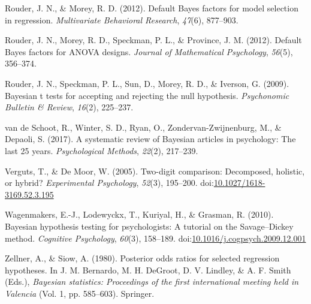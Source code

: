 \documentclass[english,,doc,floatsintext]{apa6}
\begin{document}
\leavevmode\hypertarget{ref-rouder2012defaultRegression}{}%
Rouder, J. N., \& Morey, R. D. (2012). Default Bayes factors for model selection in regression. \emph{Multivariate Behavioral Research}, \emph{47}(6), 877--903.

\leavevmode\hypertarget{ref-rouder2012defaultAnova}{}%
Rouder, J. N., Morey, R. D., Speckman, P. L., \& Province, J. M. (2012). Default Bayes factors for ANOVA designs. \emph{Journal of Mathematical Psychology}, \emph{56}(5), 356--374.

\leavevmode\hypertarget{ref-rouder2009bayesian}{}%
Rouder, J. N., Speckman, P. L., Sun, D., Morey, R. D., \& Iverson, G. (2009). Bayesian t tests for accepting and rejecting the null hypothesis. \emph{Psychonomic Bulletin \& Review}, \emph{16}(2), 225--237.

\leavevmode\hypertarget{ref-vandeschoot2017systematic}{}%
van de Schoot, R., Winter, S. D., Ryan, O., Zondervan-Zwijnenburg, M., \& Depaoli, S. (2017). A systematic review of Bayesian articles in psychology: The last 25 years. \emph{Psychological Methods}, \emph{22}(2), 217--239.

\leavevmode\hypertarget{ref-vergutsDeMoor2005}{}%
Verguts, T., \& De Moor, W. (2005). Two-digit comparison: Decomposed, holistic, or hybrid? \emph{Experimental Psychology}, \emph{52}(3), 195--200. doi:\href{https://doi.org/10.1027/1618-3169.52.3.195}{10.1027/1618-3169.52.3.195}

\leavevmode\hypertarget{ref-wagenmakers2010}{}%
Wagenmakers, E.-J., Lodewyckx, T., Kuriyal, H., \& Grasman, R. (2010). Bayesian hypothesis testing for psychologists: A tutorial on the Savage--Dickey method. \emph{Cognitive Psychology}, \emph{60}(3), 158--189. doi:\href{https://doi.org/10.1016/j.cogpsych.2009.12.001}{10.1016/j.cogpsych.2009.12.001}

\leavevmode\hypertarget{ref-zellner1980posterior}{}%
Zellner, A., \& Siow, A. (1980). Posterior odds ratios for selected regression hypotheses. In J. M. Bernardo, M. H. DeGroot, D. V. Lindley, \& A. F. Smith (Eds.), \emph{Bayesian statistics: Proceedings of the first international meeting held in Valencia} (Vol. 1, pp. 585--603). Springer.
\end{document}
